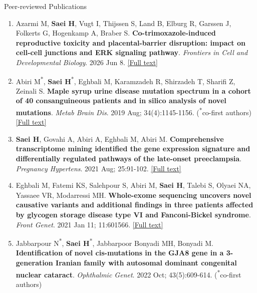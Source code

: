 \documentclass[
	11pt, %
]{resume} %
\begin{document}
\begin{rSection}{Peer-reviewed Publications}
\begin{enumerate}
    \item Azarmi M, \textbf{Saei H}, Vugt I, Thijssen S, Land B, Elburg R, Garssen J, Folkerts G, Hogenkamp A, Braber S.  \textbf{Co-trimoxazole-induced reproductive toxicity and placental-barrier disruption: impact on cell-cell junctions and ERK signaling pathway}. \textit{Frontiers in Cell and Developmental Biology}. 2026 Jun 8. \href{https://www.frontiersin.org/journals/cell-and-developmental-biology/articles/10.3389/fcell.2026.1800328/full}{[Full text]}

  \item Abiri M\textsuperscript{*}, \textbf{Saei H}\textsuperscript{*}, Eghbali M, Karamzadeh R, Shirzadeh T, Sharifi Z, Zeinali S. 
   \textbf{Maple syrup urine disease mutation spectrum in a cohort of 40 consanguineous patients and in silico analysis of novel mutations}. 
  \textit{Metab Brain Dis}. 2019 Aug; 34(4):1145-1156. (\textsuperscript{*}co-first authors) \href{https://link.springer.com/article/10.1007/s11011-019-00435-y}{[Full text]}

  \item \textbf{Saei H}, Govahi A, Abiri A, Eghbali M, Abiri M.  \textbf{Comprehensive transcriptome mining identified the gene
  expression signature and differentially regulated pathways of the late-onset preeclampsia}. 
  \textit{Pregnancy Hypertens}. 2021 Aug; 25:91-102. \href{https://www.sciencedirect.com/science/article/abs/pii/S2210778921000386?via%3Dihub}{[Full text]}

  \item Eghbali M, Fatemi KS, Salehpour S, Abiri M, \textbf{Saei H}, Talebi S, Olyaei NA, Yassaee VR, Modarressi MH. 
   \textbf{Whole-exome sequencing uncovers novel causative variants and additional findings in three patients affected by
  glycogen storage disease type VI and Fanconi-Bickel syndrome}. 
  \textit{Front Genet}. 2021 Jan 11; 11:601566. \href{https://www.frontiersin.org/journals/genetics/articles/10.3389/fgene.2020.601566/full}{[Full text]}

  \item Jabbarpour N\textsuperscript{*}, \textbf{Saei H}\textsuperscript{*}, Jabbarpoor Bonyadi MH, Bonyadi M. 
   \textbf{Identification of novel cis-mutations in the GJA8 gene in a 3-generation Iranian family with autosomal dominant congenital nuclear cataract}. 
  \textit{Ophthalmic Genet}. 2022 Oct; 43(5):609-614. (\textsuperscript{*}co-first authors)
\end{enumerate}

\end{rSection}
\end{document}

